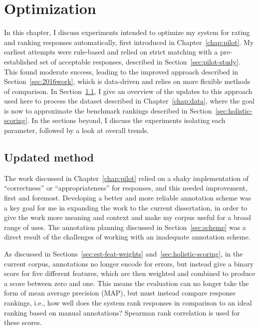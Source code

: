 \chapter{Optimization}
\label{chap:optimization}
In this chapter, I discuss experiments intended to optimize my system for rating and ranking responses automatically, first introduced in Chapter~\ref{chap:pilot}. My earliest attempts were rule-based and relied on strict matching with a pre-established set of acceptable responses, described in Section~\ref{sec:pilot-study}. This found moderate success, leading to the improved approach described in Section~\ref{sec:2016work}, which is data-driven and relies on more flexible methods of comparison.
In Section~\ref{sec:current-method}, I give an overview of the updates to this approach used here to process the dataset described in Chapter~\ref{chap:data}, where the goal is now to approximate the benchmark rankings described in Section~\ref{sec:holistic-scoring}. In the sections beyond, I discuss the experiments isolating each parameter, followed by a look at overall trends.


\section{Updated method}
\label{sec:current-method}
The work discussed in Chapter~\ref{chap:pilot} relied on a shaky implementation of ``correctness'' or ``appropriateness'' for responses, and this needed improvement, first and foremost. Developing a better and more reliable annotation scheme was a key goal for me in expanding the work to the current dissertation, in order to give the work more meaning and context and make my corpus useful for a broad range of uses. The annotation planning discussed in Section~\ref{sec:scheme} was a direct result of the challenges of working with an inadequate annotation scheme. 

As discussed in Sections~\ref{sec:est-feat-weights} and~\ref{sec:holistic-scoring}, in the current corpus, annotations no longer encode for errors, but instead give a binary score for five different features, which are then weighted and combined to produce a score between zero and one. This means the evaluation can no longer take the form of mean average precision (MAP), but must instead compare response rankings, i.e., how well does the system rank responses in comparison to an ideal ranking based on manual annotations? Spearman rank correlation is used for these scores.

